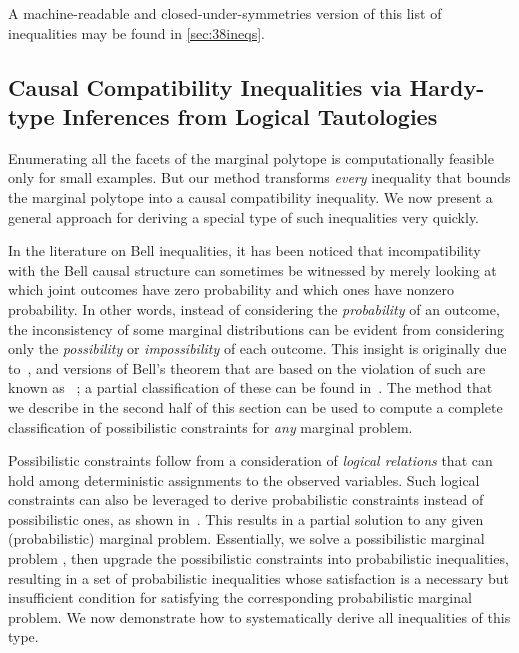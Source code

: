 \documentclass[aps,english,10pt,superscriptaddress,onecolumn,twoside,longbibliography,pra,floatfix,fleqn,nofootinbib]{revtex4-1}
\newcommand*{\tblue}[1]{{\color{MidnightBlue}{\textbf{#1}}}}
\theoremstyle{definition}
\newcounter{example}[section]
\begin{document}
A machine-readable and closed-under-symmetries version of this list of inequalities may be found in \cref{sec:38ineqs}.

\subsection{Causal Compatibility Inequalities via Hardy-type Inferences from Logical Tautologies}\label{sec:TSEM}

Enumerating all the facets of the marginal polytope is computationally feasible only for small examples. But our method transforms \emph{every} inequality that bounds the marginal polytope into a causal compatibility inequality. We now present a general approach for deriving a special type of such inequalities very quickly.

In the literature on Bell inequalities, it has been noticed that incompatibility with the Bell causal structure can sometimes be witnessed by merely looking at which joint outcomes have zero probability and which ones have nonzero probability. In other words, instead of considering the \emph{probability} of an outcome, the inconsistency of some marginal distributions can be evident from considering only the \emph{possibility} or \emph{impossibility} of each outcome. This insight is originally due to~\citet{L.Hardy:PRL:1665}, and versions of Bell's theorem that are based on the violation of such \tblue{possibilistic constraints} are known as \tblue{Hardy-type paradoxes}~\cite{Garuccio95,CabelloHardyInequality,Braun08,Mancinska14,LSW}; a partial classification of these can be found in~\cite{Mansfield2012}. The method that we describe in the second half of this section can be used to compute a complete classification of possibilistic constraints for \emph{any} marginal problem.

Possibilistic constraints follow from a consideration of {\em logical relations} that can hold among deterministic assignments to the observed variables. Such logical constraints can also be leveraged to derive probabilistic constraints instead of possibilistic ones, as shown in~\cite{Pitowsky1989,Ghirardi08}. This results in a partial solution to any given (probabilistic) marginal problem. Essentially, we solve a possibilistic marginal problem \cite{Mansfield2012}, then upgrade the possibilistic constraints into probabilistic inequalities, resulting in a set of probabilistic inequalities whose satisfaction is a necessary but insufficient condition for satisfying the corresponding probabilistic marginal problem. We now demonstrate how to systematically derive all inequalities of this type.
\end{document}
